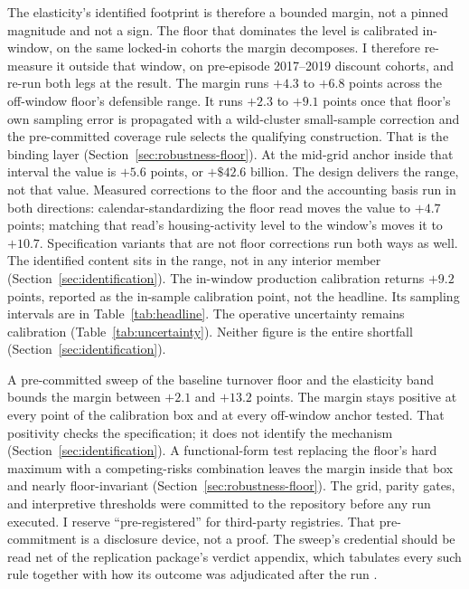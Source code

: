 \documentclass[12pt]{article}
\begin{document}
The elasticity's identified footprint is therefore a bounded margin, not a pinned magnitude and not a sign. The floor that dominates the level is calibrated in-window, on the same locked-in cohorts the margin decomposes. I therefore re-measure it outside that window, on pre-episode 2017--2019 discount cohorts, and re-run both legs at the result. The margin runs $+4.3$ to $+6.8$ points across the off-window floor's defensible range. It runs $+2.3$ to $+9.1$ points once that floor's own sampling error is propagated with a wild-cluster small-sample correction and the pre-committed coverage rule selects the qualifying construction. That is the binding layer (Section~\ref{sec:robustness-floor}). At the mid-grid anchor inside that interval the value is $+5.6$ points, or $+\$42.6$ billion. The design delivers the range, not that value. Measured corrections to the floor and the accounting basis run in both directions: calendar-standardizing the floor read moves the value to $+4.7$ points; matching that read's housing-activity level to the window's moves it to $+10.7$. Specification variants that are not floor corrections run both ways as well. The identified content sits in the range, not in any interior member (Section~\ref{sec:identification}). The in-window production calibration returns $+9.2$ points, reported as the in-sample calibration point, not the headline. Its sampling intervals are in Table~\ref{tab:headline}. The operative uncertainty remains calibration (Table~\ref{tab:uncertainty}). Neither figure is the entire shortfall (Section~\ref{sec:identification}).

A pre-committed sweep of the baseline turnover floor and the elasticity band bounds the margin between $+2.1$ and $+13.2$ points. The margin stays positive at every point of the calibration box and at every off-window anchor tested. That positivity checks the specification; it does not identify the mechanism (Section~\ref{sec:identification}). A functional-form test replacing the floor's hard maximum with a competing-risks combination leaves the margin inside that box and nearly floor-invariant (Section~\ref{sec:robustness-floor}). The grid, parity gates, and interpretive thresholds were committed to the repository before any run executed. I reserve ``pre-registered'' for third-party registries. That pre-commitment is a disclosure device, not a proof. The sweep's credential should be read net of the replication package's verdict appendix, which tabulates every such rule together with how its outcome was adjudicated after the run \citep{olken2015}.
\end{document}
